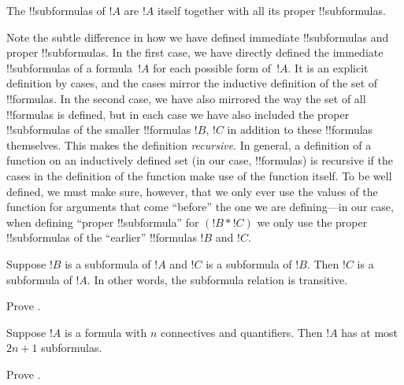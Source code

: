 \begin{defn}[!!^{subformula}]
The !!{subformula}s of $!A$ are $!A$ itself together with all its
proper !!{subformula}s.
\end{defn}

\begin{explain}
Note the subtle difference in how we have defined immediate
!!{subformula}s and proper !!{subformula}s.  In the first case, we
have directly defined the immediate !!{subformula}s of a formula~$!A$
for each possible form of~$!A$.  It is an explicit definition by
cases, and the cases mirror the inductive definition of the set of
!!{formula}s.  In the second case, we have also mirrored the way the
set of all !!{formula}s is defined, but in each case we have also
included the proper !!{subformula}s of the smaller !!{formula}s $!B$,
$!C$ in addition to these !!{formula}s themselves.  This makes the
definition \emph{recursive}.  In general, a definition of a function
on an inductively defined set (in our case, !!{formula}s) is recursive
if the cases in the definition of the function make use of
the function itself. To be well defined, we must make sure, however,
that we only ever use the values of the function for arguments that
come ``before'' the one we are defining---in our case, when defining
``proper !!{subformula}'' for $(!B \ast !C)$ we only use the proper
!!{subformula}s of the ``earlier'' !!{formula}s $!B$ and $!C$.
\end{explain}

\begin{prop}
Suppose $!B$ is a subformula of $!A$ and $!C$ is a subformula of $!B$.
Then $!C$ is a subformula of $!A$. In other words, the subformula
relation is transitive.
\end{prop}

\begin{prob}
Prove .
\end{prob}

\begin{prop}
Suppose $!A$ is a formula with $n$ connectives and quantifiers.
Then $!A$ has at most $2n+1$ subformulas.
\end{prop}

\begin{prob}
Prove .
\end{prob}





